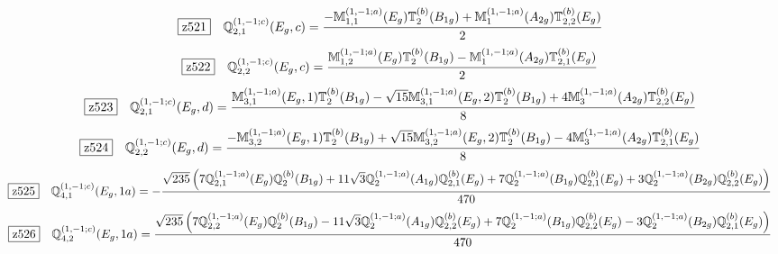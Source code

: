 \documentclass[fleqn,10pt,landscape]{jsarticle}
\begin{document}
\begin{dmath*}
\hspace*{3mm}\fbox{z521}\quad \mathbb{Q}_{2,1}^{(1,-1;c)}(E_{g},c)=\frac{- \mathbb{M}_{1,1}^{(1,-1;a)}(E_{g}) \mathbb{T}_{2}^{(b)}(B_{1g}) + \mathbb{M}_{1}^{(1,-1;a)}(A_{2g}) \mathbb{T}_{2,2}^{(b)}(E_{g})}{2}
\end{dmath*}
\begin{dmath*}
\hspace*{3mm}\fbox{z522}\quad \mathbb{Q}_{2,2}^{(1,-1;c)}(E_{g},c)=\frac{\mathbb{M}_{1,2}^{(1,-1;a)}(E_{g}) \mathbb{T}_{2}^{(b)}(B_{1g}) - \mathbb{M}_{1}^{(1,-1;a)}(A_{2g}) \mathbb{T}_{2,1}^{(b)}(E_{g})}{2}
\end{dmath*}
\begin{dmath*}
\hspace*{3mm}\fbox{z523}\quad \mathbb{Q}_{2,1}^{(1,-1;c)}(E_{g},d)=\frac{\mathbb{M}_{3,1}^{(1,-1;a)}(E_{g},1) \mathbb{T}_{2}^{(b)}(B_{1g}) - \sqrt{15} \mathbb{M}_{3,1}^{(1,-1;a)}(E_{g},2) \mathbb{T}_{2}^{(b)}(B_{1g}) + 4 \mathbb{M}_{3}^{(1,-1;a)}(A_{2g}) \mathbb{T}_{2,2}^{(b)}(E_{g})}{8}
\end{dmath*}
\begin{dmath*}
\hspace*{3mm}\fbox{z524}\quad \mathbb{Q}_{2,2}^{(1,-1;c)}(E_{g},d)=\frac{- \mathbb{M}_{3,2}^{(1,-1;a)}(E_{g},1) \mathbb{T}_{2}^{(b)}(B_{1g}) + \sqrt{15} \mathbb{M}_{3,2}^{(1,-1;a)}(E_{g},2) \mathbb{T}_{2}^{(b)}(B_{1g}) - 4 \mathbb{M}_{3}^{(1,-1;a)}(A_{2g}) \mathbb{T}_{2,1}^{(b)}(E_{g})}{8}
\end{dmath*}
\begin{dmath*}
\hspace*{3mm}\fbox{z525}\quad \mathbb{Q}_{4,1}^{(1,-1;c)}(E_{g},1a)=- \frac{\sqrt{235} \left(7 \mathbb{Q}_{2,1}^{(1,-1;a)}(E_{g}) \mathbb{Q}_{2}^{(b)}(B_{1g}) + 11 \sqrt{3} \mathbb{Q}_{2}^{(1,-1;a)}(A_{1g}) \mathbb{Q}_{2,1}^{(b)}(E_{g}) + 7 \mathbb{Q}_{2}^{(1,-1;a)}(B_{1g}) \mathbb{Q}_{2,1}^{(b)}(E_{g}) + 3 \mathbb{Q}_{2}^{(1,-1;a)}(B_{2g}) \mathbb{Q}_{2,2}^{(b)}(E_{g})\right)}{470}
\end{dmath*}
\begin{dmath*}
\hspace*{3mm}\fbox{z526}\quad \mathbb{Q}_{4,2}^{(1,-1;c)}(E_{g},1a)=\frac{\sqrt{235} \left(7 \mathbb{Q}_{2,2}^{(1,-1;a)}(E_{g}) \mathbb{Q}_{2}^{(b)}(B_{1g}) - 11 \sqrt{3} \mathbb{Q}_{2}^{(1,-1;a)}(A_{1g}) \mathbb{Q}_{2,2}^{(b)}(E_{g}) + 7 \mathbb{Q}_{2}^{(1,-1;a)}(B_{1g}) \mathbb{Q}_{2,2}^{(b)}(E_{g}) - 3 \mathbb{Q}_{2}^{(1,-1;a)}(B_{2g}) \mathbb{Q}_{2,1}^{(b)}(E_{g})\right)}{470}
\end{dmath*}
\end{document}
